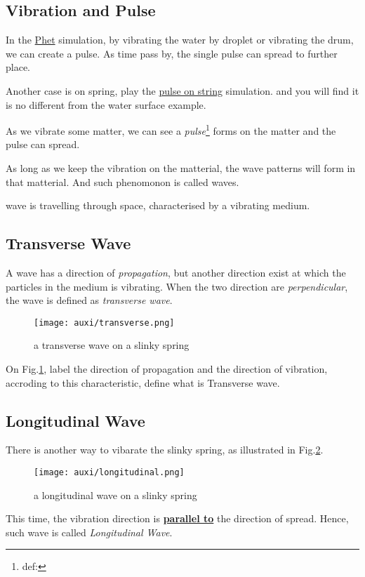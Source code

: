 \documentclass[a4paper]{tufte-handout}
\newenvironment{TaskBox} %
{\begin{tcolorbox}[breakable,colback=b1!30,colframe=b1,title=Task]} {\end{tcolorbox}}
\newenvironment{SummBox}
{\begin{tcolorbox}[breakable,colback=r1!30,colframe=r1,title=Summary]} {\end{tcolorbox}}
\begin{document}
\subsection{Vibration and Pulse}
In the \href{https://phet.colorado.edu/sims/html/waves-intro/latest/waves-intro_en.html}{Phet} simulation, by vibrating the water by droplet or vibrating the drum, we can create a pulse. As time pass by, the single pulse can spread to further place.

Another case is on spring, play the \href{https://phet.colorado.edu/sims/html/wave-on-a-string/latest/wave-on-a-string_en.html}{pulse on string} simulation. and you will find it is no different from the water surface example.

As we vibrate some matter, we can see a \emph{pulse}\footnote{def:} forms on the matter and the pulse can spread.

As long as we keep the vibration on the matterial, the wave patterns will form in that matterial. And such phenomonon is called waves.

\begin{SummBox}
wave is \uline{\phantom{a periodic disturbance        }} travelling through space, characterised by a vibrating medium.
\end{SummBox}

\subsection{Transverse Wave}
A wave has a direction of \emph{propagation}, but another direction exist at which the particles in the medium is vibrating. When the two direction are \emph{perpendicular}, the wave is defined as \emph{transverse wave}.
\begin{figure}[h]
\centering
\texttt{[image: auxi/transverse.png]}
\caption{a transverse wave on a slinky spring}
\label{fig:transverse}
\end{figure}

\begin{TaskBox}
On Fig.\ref{fig:transverse}, label the direction of propagation and the direction of vibration, accroding to this characteristic, define what is Transverse wave.
\vspace{0.5 in}
\end{TaskBox}

\subsection{Longitudinal Wave}
There is another way to vibarate the slinky spring, as illustrated in Fig.\ref{fig:longitudinal}. 
\begin{figure}[h]
\centering
\texttt{[image: auxi/longitudinal.png]}
\caption{a longitudinal wave on a slinky spring}
\label{fig:longitudinal}
\end{figure}
This time, the vibration direction is \uline{\textbf{parallel to}} the direction of spread. Hence, such wave is called \emph{Longitudinal Wave}.
\end{document}

